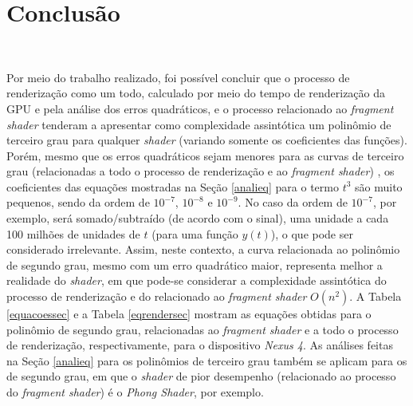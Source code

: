 \chapter[Conclusao]{Conclusão}\

	Por meio do trabalho realizado, foi possível concluir que o processo de renderização como um todo, calculado por meio do tempo de renderização da GPU e pela análise dos erros quadráticos, e o processo relacionado ao \textit{fragment shader} tenderam a apresentar como complexidade assintótica um polinômio de terceiro grau para qualquer \textit{shader} (variando somente os coeficientes das funções). Porém, mesmo que os erros quadráticos sejam menores para as curvas de terceiro grau (relacionadas a todo o processo de renderização e ao \textit{fragment shader}) , os coeficientes das equações mostradas na Seção \ref{analieq} para o termo $t^3$ são muito pequenos, sendo da ordem de  $10^{-7}$, $10^{-8}$ e $10^{-9}$.  No caso da ordem de $10^{-7}$, por exemplo, será somado/subtraído (de acordo com o sinal), uma unidade a cada 100 milhões de unidades de $t$ (para uma função $y(t)$), o que pode ser considerado irrelevante. Assim, neste contexto, a curva relacionada ao polinômio de segundo grau, mesmo com um erro quadrático maior, representa melhor a realidade do \textit{shader}, em que pode-se considerar a complexidade assintótica do processo de renderização e do relacionado ao \textit{fragment shader} $O(n^2)$. A Tabela \ref{equacoessec} e a Tabela \ref{eqrendersec} mostram as equações obtidas para o polinômio de segundo grau, relacionadas ao \textit{fragment shader} e a todo o processo de renderização, respectivamente, para o dispositivo \textit{Nexus 4}. As análises feitas na Seção \ref{analieq} para os polinômios de terceiro grau também se aplicam para os de segundo grau, em que o \textit{shader} de pior desempenho (relacionado ao processo do \textit{fragment shader}) é o \textit{Phong Shader}, por exemplo. 

